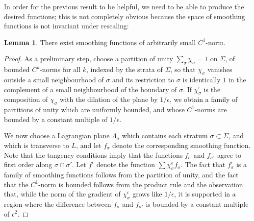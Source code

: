 \documentclass[11pt]{article}
\theoremstyle{definition}
\newtheorem{lemma}{Lemma}
\begin{document}
  In order for the previous result to be helpful, we need to be able to produce the desired functions; this is not completely obvious because the space of smoothing functions is not invariant under rescaling:
  \begin{lemma} \label{lem:local_approximate_Sigma}
    There exist smoothing functions of arbitrarily small $C^1$-norm.
  \end{lemma}
  \begin{proof}
As a preliminary step, choose a partition of unity $\sum_\sigma \chi_\sigma =1 $ on $\Sigma$, of bounded $C^k$-norms for all $k$, indexed by the strata of $\Sigma$, so that $ \chi_\sigma$ vanishes outside a small neighbourhood of $\sigma$ and its restriction to $\sigma$ is identically $1$ in the complement of a small neighbourhood of the boundary of $\sigma$. If $ \chi^\epsilon_\sigma  $ is the composition of $\chi_\sigma$ with the dilation of the plane by $1/\epsilon$, we obtain a family of partitions of unity which are uniformly bounded, and whose $C^1$-norms are bounded by a constant multiple of $1/\epsilon$.

We now choose a Lagrangian plane $\Lambda_\sigma$ which contains each stratum $\sigma \subset \Sigma$, and which is transverse to $L$, and let $f_\sigma$ denote the corresponding smoothing function. Note that the tangency conditions imply that the functions $f_\sigma$ and $f_{\sigma'}$ agree to first order along $\sigma \cap \sigma'$. Let $f^\epsilon$ denote the function $\sum \chi^\epsilon_\sigma f_\sigma $. The fact that $ f^\epsilon_\sigma$ is a family of smoothing functions follows from the partition of unity, and the fact that the $C^1$-norm is bounded follows from the product rule and the observation that, while the norm of the gradient of $\chi^\epsilon_\sigma $ grows like $1/\epsilon$, it is supported in a region where the difference between $f_\sigma$ and $f_{\sigma'}$ is bounded by a constant multiple of $\epsilon^2$.
\end{proof}

  
\end{document}
